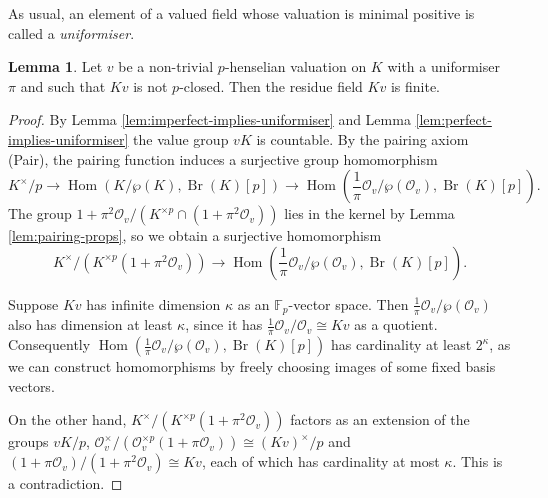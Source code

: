 \documentclass[a4paper, british, oneside]{amsart}
\newcommand{\F}{\mathbb{F}}
\DeclareMathOperator{\Br}{Br}
\DeclareMathOperator{\Hom}{Hom}
\theoremstyle{definition}
\newtheorem{lemma}[theorem]{Lemma}
\theoremstyle{remark}
\begin{document}
As usual, an element of a valued field whose valuation is minimal positive is called a \emph{uniformiser}.
\begin{lemma}\label{lem:finite-residue}
  Let $v$ be a non-trivial $p$-henselian valuation on $K$
  with a uniformiser $\pi$ and such that $Kv$ is not $p$-closed.
  Then the residue field $Kv$ is finite.
\end{lemma}
\begin{proof}
  By Lemma \ref{lem:imperfect-implies-uniformiser} and Lemma \ref{lem:perfect-implies-uniformiser}
  the value group $vK$ is countable.
  By the pairing axiom (Pair), the pairing function induces a surjective group homomorphism
  \[ K^\times/p \to \Hom(K/\wp(K), \Br(K)[p]) \to \Hom(\frac{1}{\pi}\mathcal{O}_v/\wp(\mathcal{O}_v), \Br(K)[p]) . \]
  The group $1 + \pi^2\mathcal{O}_v/(K^{\times p} \cap (1 + \pi^2\mathcal{O}_v))$ lies in the kernel by Lemma \ref{lem:pairing-props},
  so we obtain a surjective homomorphism
  \[ K^\times/(K^{\times p} (1 + \pi^2\mathcal{O}_v)) \to \Hom(\frac{1}{\pi}\mathcal{O}_v/\wp(\mathcal{O}_v), \Br(K)[p]). \]

  Suppose $Kv$ has infinite dimension $\kappa$ as an $\F_p$-vector space.
  Then $\frac{1}{\pi}\mathcal{O}_v/\wp(\mathcal{O}_v)$ also has dimension at least $\kappa$, since it has $\frac{1}{\pi}\mathcal{O}_v/\mathcal{O}_v \cong Kv$ as a quotient.
  Consequently $\Hom(\frac{1}{\pi}\mathcal{O}_v/\wp(\mathcal{O}_v), \Br(K)[p])$ has cardinality at least $2^\kappa$,
  as we can construct homomorphisms by freely choosing images of some fixed basis vectors.

  On the other hand, $K^\times/(K^{\times p} (1 + \pi^2\mathcal{O}_v))$ factors as an extension of the groups $vK/p$,
  \linebreak
  $\mathcal{O}_v^\times/(\mathcal{O}_v^{\times p} (1 + \pi \mathcal{O}_v)) \cong (Kv)^\times/p$ and $(1 + \pi \mathcal{O}_v) / (1 + \pi^2 \mathcal{O}_v) \cong Kv$,
  each of which has cardinality at most $\kappa$.
  This is a contradiction.
\end{proof}
\end{document}
